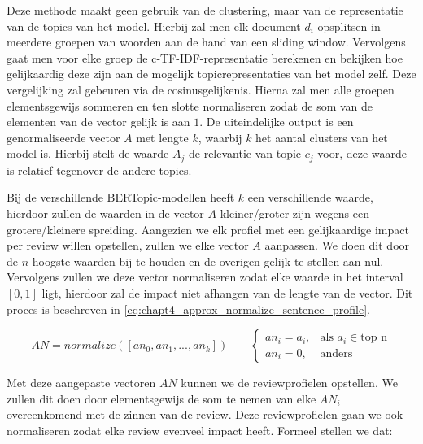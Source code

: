 Deze methode maakt geen gebruik van de clustering, maar van de representatie van de topics van het model. Hierbij zal men elk document $d_i$ opsplitsen in meerdere groepen van woorden aan de hand van een sliding window. Vervolgens gaat men voor elke groep de c-TF-IDF-representatie berekenen en bekijken hoe gelijkaardig deze zijn aan de mogelijk topicrepresentaties van het model zelf. Deze vergelijking zal gebeuren via de cosinusgelijkenis. Hierna zal men alle groepen elementsgewijs sommeren en ten slotte normaliseren zodat de som van de elementen van de vector gelijk is aan $1$. De uiteindelijke output is een genormaliseerde vector $A$ met lengte $k$, waarbij $k$ het aantal clusters van het model is. Hierbij stelt de waarde $A_j$ de relevantie van topic $c_j$ voor, deze waarde is relatief tegenover de andere topics.


Bij de verschillende BERTopic-modellen heeft $k$ een verschillende waarde, hierdoor zullen de waarden in de vector $A$ kleiner/groter zijn wegens een grotere/kleinere spreiding. Aangezien we elk profiel met een gelijkaardige impact per review willen opstellen, zullen we elke vector $A$ aanpassen. We doen dit door de $n$ hoogste waarden bij te houden en de overigen gelijk te stellen aan nul. Vervolgens zullen we deze vector normaliseren zodat elke waarde in het interval $[0,1]$ ligt, hierdoor zal de impact niet afhangen van de lengte van de vector. Dit proces is beschreven in \autoref{eq:chapt4_approx_normalize_sentence_profile}. 

\begin{equation}
AN = normalize([an_0, an_1, ..., an_k]) \;\;\;\;\;\;\;
\label{eq:chapt4_approx_normalize_sentence_profile}
\begin{cases}
    an_i = a_i, & \text{als } a_i \in \text{top n}  \\
    an_i = 0,   & \text{anders}
\end{cases}
\end{equation}

Met deze aangepaste vectoren $AN$ kunnen we de reviewprofielen opstellen. We zullen dit doen door elementsgewijs de som te nemen van elke $AN_i$ overeenkomend met de zinnen van de review. Deze reviewprofielen gaan we ook normaliseren zodat elke review evenveel impact heeft. Formeel stellen we dat:


